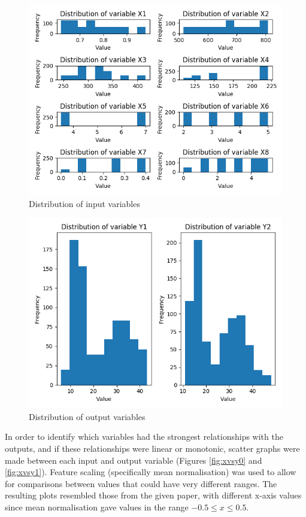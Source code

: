 \documentclass[12pt]{article}
\begin{document}
\begin{figure}[!ht]
\centering
\includegraphics[width=0.8 \linewidth]{images/XDist}
\caption{Distribution of input variables}
\label{fig:xdist}
\end{figure}

\begin{figure}[!ht]
\centering
\includegraphics[width=0.8 \linewidth]{images/YDist}
\caption{Distribution of output variables}
\label{fig:ydist}
\end{figure}

\FloatBarrier

In order to identify which variables had the strongest relationships with the outputs, and if these relationships were linear or monotonic, scatter graphs were made between each input and output variable (Figures \ref{fig:xvsy0} and \ref{fig:xvsy1}). Feature scaling (specifically mean normalisation) was used to allow for comparisons between values that could have very different ranges. The resulting plots resembled those from the given paper, with different x-axis values since mean normalisation gave values in the range $-0.5 \leq x \leq 0.5 $.
\end{document}
